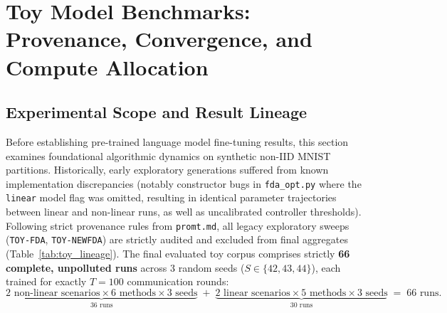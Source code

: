 \documentclass[10pt,a4paper]{article}
\begin{document}
\clearpage
\section{Toy Model Benchmarks: Provenance, Convergence, and Compute Allocation}

\subsection{Experimental Scope and Result Lineage}
Before establishing pre-trained language model fine-tuning results, this section examines foundational algorithmic dynamics on synthetic non-IID MNIST partitions.
Historically, early exploratory generations suffered from known implementation discrepancies (notably constructor bugs in \texttt{fda\_opt.py} where the \texttt{linear} model flag was omitted, resulting in identical parameter trajectories between linear and non-linear runs, as well as uncalibrated controller thresholds).
Following strict provenance rules from \texttt{promt.md}, all legacy exploratory sweeps (\texttt{TOY-FDA}, \texttt{TOY-NEWFDA}) are strictly audited and excluded from final aggregates (Table~\ref{tab:toy_lineage}).
The final evaluated toy corpus comprises strictly \textbf{66 complete, unpolluted runs} across 3 random seeds ($S \in \{42, 43, 44\}$), each trained for exactly $T=100$ communication rounds:
\begin{equation}
    \underbrace{2\text{ non-linear scenarios} \times 6\text{ methods} \times 3\text{ seeds}}_{36\text{ runs}} \;+\; \underbrace{2\text{ linear scenarios} \times 5\text{ methods} \times 3\text{ seeds}}_{30\text{ runs}} \;=\; 66\text{ runs}.
\end{equation}
\end{document}
